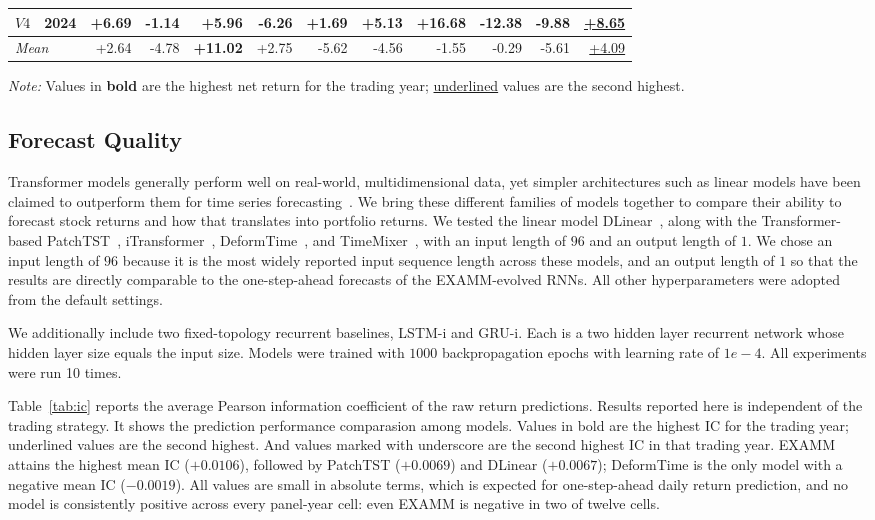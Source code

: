\begin{table}[t]
\begin{threeparttable}
\begin{tabular}{llrrrrrrrrrr}
$V4$ & 2024 & +6.69 & -1.14 & +5.96 & -6.26 & +1.69 & +5.13 & \textbf{+16.68} & -12.38 & -9.88 & \underline{+8.65} \\
\midrule
\multicolumn{2}{l}{\textit{Mean}} & +2.64 & -4.78 & \textbf{+11.02} & +2.75 & -5.62 & -4.56 & -1.55 & -0.29 & -5.61 & \underline{+4.09} \\
\bottomrule
\end{tabular}%
\begin{tablenotes}[flushleft]
\footnotesize
\item \textit{Note:} Values in \textbf{bold} are the highest net return for the trading year; \underline{underlined} values are the second highest.
\end{tablenotes}
\end{threeparttable}
\end{table}

\subsection{Forecast Quality}
\label{sec:examm-vs-transformers}
Transformer models generally perform well on real-world, multidimensional data, yet simpler architectures such as linear models have been claimed to outperform them for time series forecasting~\cite{zeng2023transformers}. We bring these different families of models together to compare their ability to forecast stock returns and how that translates into portfolio returns. We tested the linear model DLinear~\cite{zeng2023transformers}, along with the Transformer-based PatchTST~\cite{nie2022time}, iTransformer~\cite{liu2024itransformer}, DeformTime~\cite{shu2024deformtime}, and TimeMixer~\cite{wang2023timemixer}, with an input length of $96$ and an output length of $1$. We chose an input length of $96$ because it is the most widely reported input sequence length across these models, and an output length of $1$ so that the results are directly comparable to the one-step-ahead forecasts of the EXAMM-evolved RNNs. All other hyperparameters were adopted from the default settings.

We additionally include two fixed-topology recurrent baselines, LSTM-i and GRU-i. Each is a two hidden layer recurrent network whose hidden layer size equals the input size. Models were trained with $1000$ backpropagation epochs with learning rate of $1e-4$. All experiments were run 10 times. 


Table~\ref{tab:ic} reports the average Pearson information coefficient of the raw return predictions. Results reported here is independent of the trading strategy. It shows the prediction performance comparasion among models. Values in bold are the highest IC for the trading year; underlined values are the second highest. And values marked with underscore are the second highest IC in that trading year. EXAMM attains the highest mean IC ($+0.0106$), followed by PatchTST ($+0.0069$) and DLinear ($+0.0067$); DeformTime is the only model with a negative mean IC ($-0.0019$). All values are small in absolute terms, which is expected for one-step-ahead daily return prediction, and no model is consistently positive across every panel-year cell: even EXAMM is negative in two of twelve cells.

